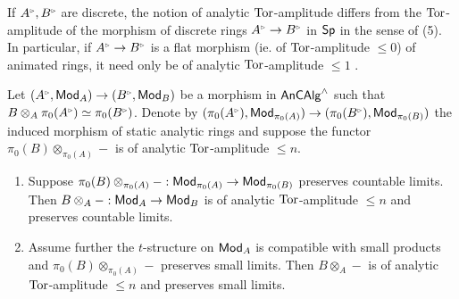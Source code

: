 \begin{remark}\label{rmk: analytic tor-amplitude}
    If $A^{\tri},B^{\tri}$ are discrete, the notion of analytic $\mathrm{Tor}$-amplitude differs from the $\mathrm{Tor}$-amplitude of the morphism of discrete rings $A^{\tri}\to B^{\tri}$ in $\mathsf{Sp}$ in the sense of  (5). In particular, if $A^{\tri}\to B^{\tri}$ is a flat morphism (ie. of $\mathrm{Tor}$-amplitude $\leq0$) of animated rings, it need only be of analytic $\mathrm{Tor}$-amplitude $\leq 1$ \cite[Lem. 4.10]{MikamiFPPF}. 
\end{remark}
\begin{lemma}\label{lem: tor amplitude and limits}
    Let $(A^{\tri},\Mod_{A})\to (B^{\tri},\Mod_{B})$ be a morphism in $\mathsf{An}\mathsf{CAlg}^{\wedge}$ such that $B\otimes_{A}\pi_{0}(A^{\tri})\simeq\pi_{0}(B^{\tri})$. Denote by $(\pi_{0}(A^{\tri}),\Mod_{\pi_{0}(A)})\to(\pi_{0}(B^{\tri}),\Mod_{\pi_{0}(B)})$ the induced morphism of static analytic rings and suppose the functor $\pi_{0}(B)\otimes_{\pi_{0}(A)}-$ is of analytic $\mathrm{Tor}$-amplitude $\leq n$.
    \begin{enumerate}
        \item Suppose $\pi_{0}(B)\otimes_{\pi_{0}(A)}-:\mathsf{Mod}_{\pi_{0}(A)}\to\mathsf{Mod}_{\pi_{0}(B)}$ preserves countable limits. Then $B\otimes_{A}-:\mathsf{Mod}_{A}\to\mathsf{Mod}_{B}$ is of analytic $\mathrm{Tor}$-amplitude $\leq n$ and preserves countable limits. 
        \item Assume further the $t$-structure on $\mathsf{Mod}_{A}$ is compatible with small products and $\pi_{0}(B)\otimes_{\pi_{0}(A)}-$ preserves small limits. Then $B\otimes_{A}-$ is of analytic $\mathrm{Tor}$-amplitude $\leq n$ and preserves small limits. 
    \end{enumerate}
\end{lemma}
